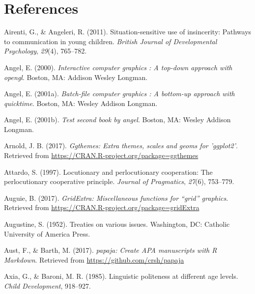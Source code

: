 \documentclass[oneside]{report}
\begin{document}
\chapter*{References}\label{references}


\noindent

\setlength{\parindent}{-0.20in} \setlength{\leftskip}{0.20in}
\setlength{\parskip}{8pt}

\hypertarget{refs}{}
\hypertarget{ref-airenti2011}{}
Airenti, G., \& Angeleri, R. (2011). Situation-sensitive use of
insincerity: Pathways to communication in young children. \emph{British
Journal of Developmental Psychology}, \emph{29}(4), 765--782.

\hypertarget{ref-angel2000}{}
Angel, E. (2000). \emph{Interactive computer graphics : A top-down
approach with opengl}. Boston, MA: Addison Wesley Longman.

\hypertarget{ref-angel2001}{}
Angel, E. (2001a). \emph{Batch-file computer graphics : A bottom-up
approach with quicktime}. Boston, MA: Wesley Addison Longman.

\hypertarget{ref-angel2002a}{}
Angel, E. (2001b). \emph{Test second book by angel}. Boston, MA: Wesley
Addison Longman.

\hypertarget{ref-R-ggthemes}{}
Arnold, J. B. (2017). \emph{Ggthemes: Extra themes, scales and geoms for
'ggplot2'}. Retrieved from
\url{https://CRAN.R-project.org/package=ggthemes}

\hypertarget{ref-attardo1997}{}
Attardo, S. (1997). Locutionary and perlocutionary cooperation: The
perlocutionary cooperative principle. \emph{Journal of Pragmatics},
\emph{27}(6), 753--779.

\hypertarget{ref-R-gridExtra}{}
Auguie, B. (2017). \emph{GridExtra: Miscellaneous functions for ``grid''
graphics}. Retrieved from
\url{https://CRAN.R-project.org/package=gridExtra}

\hypertarget{ref-augustine1952}{}
Augustine, S. (1952). Treaties on various issues. Washington, DC:
Catholic University of America Press.

\hypertarget{ref-R-papaja}{}
Aust, F., \& Barth, M. (2017). \emph{papaja: Create APA manuscripts with
R Markdown}. Retrieved from \url{https://github.com/crsh/papaja}

\hypertarget{ref-axia1985}{}
Axia, G., \& Baroni, M. R. (1985). Linguistic politeness at different
age levels. \emph{Child Development}, 918--927.
\end{document}
